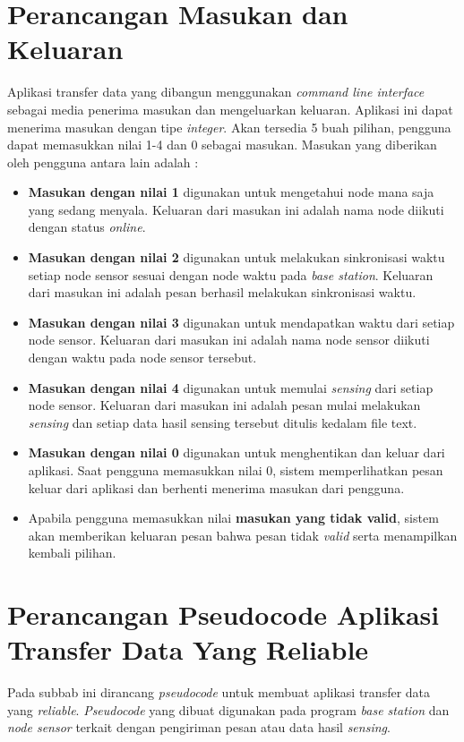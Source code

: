 \section{Perancangan Masukan dan Keluaran}
Aplikasi transfer data yang dibangun menggunakan \textit{command line interface} sebagai media penerima masukan dan mengeluarkan keluaran. Aplikasi ini dapat menerima masukan dengan tipe \textit{integer}. Akan tersedia 5 buah pilihan, pengguna dapat memasukkan nilai 1-4 dan 0 sebagai masukan. Masukan yang diberikan oleh pengguna antara lain adalah :
\begin{itemize}
\item \textbf{Masukan dengan nilai 1} digunakan untuk mengetahui node mana saja yang sedang menyala. Keluaran dari masukan ini adalah nama node diikuti dengan status \textit{online}.
\item \textbf{Masukan dengan nilai 2} digunakan untuk melakukan sinkronisasi waktu setiap node sensor sesuai dengan node waktu pada \textit{base station}. Keluaran dari masukan ini adalah pesan berhasil melakukan sinkronisasi waktu.
\item \textbf{Masukan dengan nilai 3} digunakan untuk mendapatkan waktu dari setiap node sensor. Keluaran dari masukan ini adalah nama node sensor diikuti dengan waktu pada node sensor tersebut.
\item \textbf{Masukan dengan nilai 4} digunakan untuk memulai \textit{sensing} dari setiap node sensor. Keluaran dari masukan ini adalah pesan mulai melakukan \textit{sensing} dan setiap data hasil sensing tersebut ditulis kedalam file text.
\item \textbf{Masukan dengan nilai 0} digunakan untuk menghentikan dan keluar dari aplikasi. Saat pengguna memasukkan nilai 0, sistem memperlihatkan pesan keluar dari aplikasi dan berhenti menerima masukan dari pengguna.
\item Apabila pengguna memasukkan nilai \textbf{masukan yang tidak valid}, sistem akan memberikan keluaran pesan bahwa pesan tidak \textit{valid} serta menampilkan kembali pilihan. 
\end{itemize} 

\section{Perancangan Pseudocode Aplikasi Transfer Data Yang Reliable}
Pada subbab ini dirancang \textit{pseudocode} untuk membuat aplikasi transfer data yang \textit{reliable}. \textit{Pseudocode} yang dibuat digunakan pada program \textit{base station} dan \textit{node sensor} terkait dengan pengiriman pesan atau data hasil \textit{sensing}.

